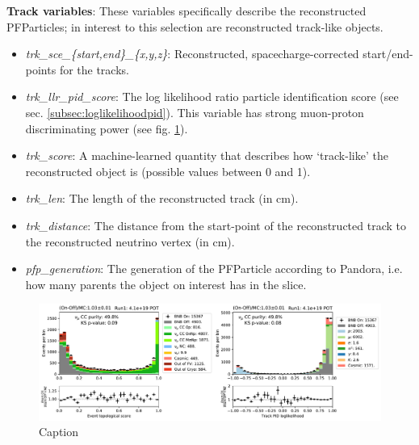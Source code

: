 \par \noindent \textbf{Track variables}: These variables specifically describe the reconstructed PFParticles; in interest to this selection are reconstructed track-like objects. 
\begin{itemize}
    \item \emph{trk\_sce\_\{start,end\}\_\{x,y,z\}}: Reconstructed, spacecharge-corrected start/end-points for the tracks.
    \item \emph{trk\_llr\_pid\_score}: The log likelihood ratio particle identification score (see sec. \ref{subsec:loglikelihoodpid}). This variable has strong muon-proton discriminating power (see fig. \ref{fig:numu_topo_pid}).
    \item \emph{trk\_score}: A machine-learned quantity that describes how `track-like' the reconstructed object is (possible values between 0 and 1).
    \item \emph{trk\_len}: The length of the reconstructed track (in cm).
    \item \emph{trk\_distance}: The distance from the start-point of the reconstructed track to the reconstructed neutrino vertex (in cm).
    \item \emph{pfp\_generation}: The generation of the PFParticle according to Pandora, i.e. how many parents the object on interest has in the slice.
\end{itemize}

\begin{figure}
    \centering
    \includegraphics[width=\textwidth]{NuMuCCsel/Images/run1/numu_pret_run1.pdf}
    \caption{Caption}
    \label{fig:numu_topo_pid}
\end{figure}

